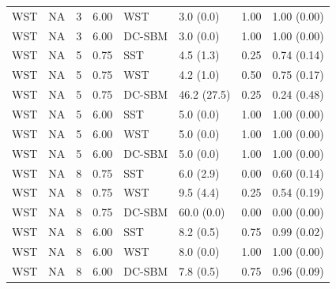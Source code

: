 \begin{table}
\begin{tabular}[t]{llrrllll}
WST & NA & 3 & 6.00 & WST & 3.0 (0.0) & 1.00 & 1.00 (0.00)\\
\addlinespace
WST & NA & 3 & 6.00 & DC-SBM & 3.0 (0.0) & 1.00 & 1.00 (0.00)\\
WST & NA & 5 & 0.75 & SST & 4.5 (1.3) & 0.25 & 0.74 (0.14)\\
WST & NA & 5 & 0.75 & WST & 4.2 (1.0) & 0.50 & 0.75 (0.17)\\
WST & NA & 5 & 0.75 & DC-SBM & 46.2 (27.5) & 0.25 & 0.24 (0.48)\\
WST & NA & 5 & 6.00 & SST & 5.0 (0.0) & 1.00 & 1.00 (0.00)\\
\addlinespace
WST & NA & 5 & 6.00 & WST & 5.0 (0.0) & 1.00 & 1.00 (0.00)\\
WST & NA & 5 & 6.00 & DC-SBM & 5.0 (0.0) & 1.00 & 1.00 (0.00)\\
WST & NA & 8 & 0.75 & SST & 6.0 (2.9) & 0.00 & 0.60 (0.14)\\
WST & NA & 8 & 0.75 & WST & 9.5 (4.4) & 0.25 & 0.54 (0.19)\\
WST & NA & 8 & 0.75 & DC-SBM & 60.0 (0.0) & 0.00 & 0.00 (0.00)\\
\addlinespace
WST & NA & 8 & 6.00 & SST & 8.2 (0.5) & 0.75 & 0.99 (0.02)\\
WST & NA & 8 & 6.00 & WST & 8.0 (0.0) & 1.00 & 1.00 (0.00)\\
WST & NA & 8 & 6.00 & DC-SBM & 7.8 (0.5) & 0.75 & 0.96 (0.09)\\
\bottomrule
\end{tabular}
\end{table}
